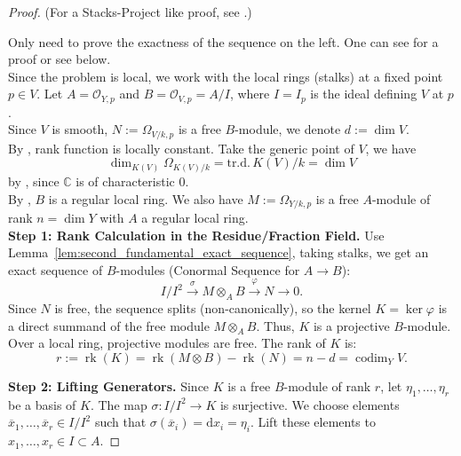 \begin{proof}
    (For a Stacks-Project like proof, see \cite[Thm.~4.18.]{Mihatsch2024EllipticCurvesModuli}.)

    Only need to prove the exactness of the sequence on the left. One can see \cite[Chap.~2, Thm.~8.17.]{hartshorne1977algebraic} for a proof or see below.\\

    Since the problem is local, we work with the local rings (stalks) at a fixed point $p \in V$.
    Let $A = \mathcal{O}_{Y,p}$ and $B = \mathcal{O}_{V,p} = A/I$, where $I = I_p$ is the ideal defining $V$ at $p$.\\

    Since $V$ is smooth, $N := \Omega_{V/k, p}$ is a free $B$-module, we denote $d:= \dim V$.\\

    By \cite[\href{https://stacks.math.columbia.edu/tag/0FWG}{Tag 0FWG}]{stacks-project}, rank function is locally constant. Take the generic point of $V$, we have
    \[
        \dim_{K(V)} \Omega_{K(V)/k} = \text{tr.d.}\, K(V)/k = \dim V
    \]
    by \cite[Chap.~2.~Thm.~8.6A. and Chap.~1.~1.8A.]{hartshorne1977algebraic}, since $\mathbb{C}$ is of characteristic 0.\\

    By \cite[Chap.~2.~Thm.~8.8.]{hartshorne1977algebraic}, $B$ is a regular local ring. We also have $M := \Omega_{Y/k, p}$ is a free $A$-module of rank $n = \dim Y$ with $A$ a regular local ring.\\

    \textbf{Step 1: Rank Calculation in the Residue/Fraction Field.}
    Use Lemma~\ref{lem:second_fundamental_exact_sequence}, taking stalks, we get an exact sequence of $B$-modules (Conormal Sequence for $A \to B$):
    \[
        I/I^2 \xrightarrow{\sigma} M \otimes_A B \xrightarrow{\varphi} N \longrightarrow 0.
    \]
    Since $N$ is free, the sequence splits (non-canonically), so the kernel $K = \ker \varphi$ is a direct summand of the free module $M \otimes_A B$. Thus, $K$ is a projective $B$-module. Over a local ring, projective modules are free.
    The rank of $K$ is:
    \[
        r := \operatorname{rk}(K) = \operatorname{rk}(M \otimes B) - \operatorname{rk}(N) = n - d = \operatorname{codim}_Y V.
    \]

    \textbf{Step 2: Lifting Generators.}
    Since $K$ is a free $B$-module of rank $r$, let $\eta_1, \dots, \eta_r$ be a basis of $K$.
    The map $\sigma: I/I^2 \to K$ is surjective. We choose elements $\overline{x}_1, \dots, \overline{x}_r \in I/I^2$ such that $\sigma(\overline{x}_i) = \text{d}x_i = \eta_i$.
    Lift these elements to $x_1, \dots, x_r \in I \subset A$.


\end{proof}
